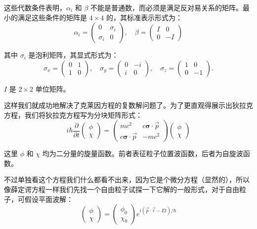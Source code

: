\documentclass[UTF8]{ctexbook}
\begin{document}
这些代数条件表明，\(\alpha_i\) 和 \(\beta\) 不能是普通数，而必须是满足反对易关系的矩阵。最小的满足这些条件的矩阵是 \(4\times 4\) 的，其标准表示形式为：
\[
\alpha_i = \begin{pmatrix} 0 & \sigma_i \\ \sigma_i & 0 \end{pmatrix}, \quad \beta = \begin{pmatrix} I & 0 \\ 0 & -I \end{pmatrix}
\]

其中 \(\sigma_i\) 是泡利矩阵，其显式形式为：
\[
\sigma_x=\begin{pmatrix}0&1\\1&0\end{pmatrix},\quad
\sigma_y=\begin{pmatrix}0&-i\\i&0\end{pmatrix},\quad
\sigma_z=\begin{pmatrix}1&0\\0&-1\end{pmatrix}.
\]

\(I\) 是 \(2\times 2\) 单位矩阵。

这样我们就成功地解决了克莱因方程的复数解问题了。为了更直观得展示出狄拉克方程，我们将狄拉克方程写为分块矩阵形式：
\[
i\hbar\frac{\partial}{\partial t} \begin{pmatrix} \phi \\ \chi \end{pmatrix} = \begin{pmatrix} mc^2 & c\boldsymbol{\sigma}\cdot\vec{p} \\ c\boldsymbol{\sigma}\cdot\vec{p} & -mc^2 \end{pmatrix} \begin{pmatrix} \phi \\ \chi \end{pmatrix}
\]

这里 \(\phi\) 和 \(\chi\) 均为二分量的旋量函数。前者表征粒子位置波函数，后者为自旋波函数。

不过单独看这个方程我们什么都看不出来，因为它是个微分方程（显然的），所以像薛定谔方程一样我们先找一个自由粒子试探一下它解的一般形式，对于自由粒子，可假设平面波解：
\[
\begin{pmatrix} \phi \\ \chi \end{pmatrix} = \begin{pmatrix} \phi_0 \\ \chi_0 \end{pmatrix} e^{i(\vec{p}\cdot\vec{r} - Et)/\hbar}
\]
\end{document}
